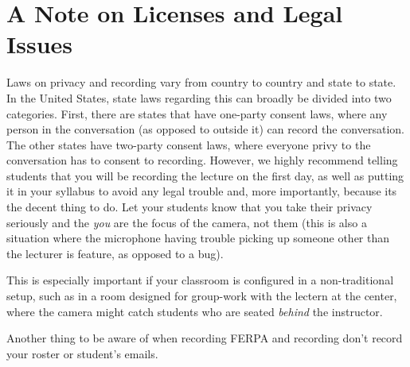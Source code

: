 \documentclass[sigconf]{acmart}
\begin{document}
\section{A Note on Licenses and Legal Issues}
\label{legal}

Laws on privacy and recording vary from country to country and state to state.
In the United States, state laws regarding this can broadly be divided into two categories.
First, there are states that have one-party consent laws, where any person in the conversation (as opposed to outside it) can record the conversation.
The other states have two-party consent laws, where everyone privy to the conversation has to consent to recording.
However, we highly recommend telling students that you will be recording the lecture on the first day, as well as putting it in your syllabus to avoid any legal trouble and, more importantly, because its the decent thing to do.
Let your students know that you take their privacy seriously and the \textit{you} are the focus of the camera, not them (this is also a situation where the microphone having trouble picking up someone other than the lecturer is feature, as opposed to a bug).

This is especially important if your classroom is configured in a non-traditional setup, such as in a room designed for group-work with the lectern at the center, where the camera might catch students who are seated \textit{behind} the instructor.



Another thing to be aware of when recording 
FERPA and recording
don't record your roster or student's emails.





\end{document}
